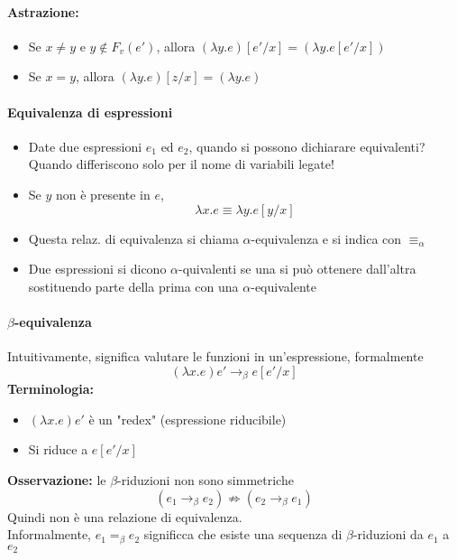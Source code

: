 \documentclass[a4paper,12pt]{article}
\begin{document}
\paragraph{Astrazione:}
\begin{itemize}
	\item Se $x \neq y$ e $y \notin F_{v}(e')$, allora $(\lambda y.e)[e'/x] = (\lambda y.e[e'/x])$
	\item Se $x = y$, allora $(\lambda y.e)[z/x] = (\lambda y.e)$
\end{itemize}

\paragraph{Equivalenza di espressioni\\}
\begin{itemize}
	\item Date due espressioni $e_{1}$ ed $e_{2}$, quando si possono dichiarare equivalenti?\\
	Quando differiscono solo per il nome di variabili legate!
	\item Se $y$ non è presente in $e$, \[ \lambda x.e \equiv \lambda y.e[y/x] \]
	\item Questa relaz. di equivalenza si chiama $\alpha$-equivalenza e si indica con $\equiv_{\alpha}$
	\item Due espressioni si dicono $\alpha$-quivalenti se una si può ottenere dall'altra sostituendo parte della prima con una $\alpha$-equivalente
\end{itemize}

\paragraph{$\beta$-equivalenza\\}
Intuitivamente, significa valutare le funzioni in un'espressione, formalmente \[ (\lambda x.e)e' \rightarrow_{\beta} e[e'/x] \]
\textbf{Terminologia:}
\begin{itemize}
	\item $ (\lambda x.e)e'$ è un "redex" (espressione riducibile)
	\item Si riduce a $e[e'/x]$
\end{itemize}
\textbf{Osservazione: } le $\beta$-riduzioni non sono simmetriche \[(e_{1} \rightarrow_{\beta} e_{2}) \not\Rightarrow (e_{2} \rightarrow_{\beta} e_{1}) \]
Quindi non è una relazione di equivalenza.\\
Informalmente, $e_{1} =_{\beta} e_{2}$ significca che esiste una sequenza di $\beta$-riduzioni da $e_{1}$ a $e_{2}$
\end{document}
